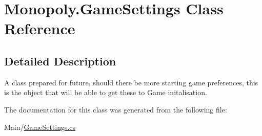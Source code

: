 \hypertarget{class_monopoly_1_1_game_settings}{}\section{Monopoly.\+Game\+Settings Class Reference}
\label{class_monopoly_1_1_game_settings}


\subsection{Detailed Description}
A class prepared for future, should there be more starting game preferences, this is the object that will be able to get these to Game initalisation. 

The documentation for this class was generated from the following file\+:\begin{DoxyCompactItemize}
\item 
Main/\mbox{\hyperlink{_game_settings_8cs}{Game\+Settings.\+cs}}\end{DoxyCompactItemize}
